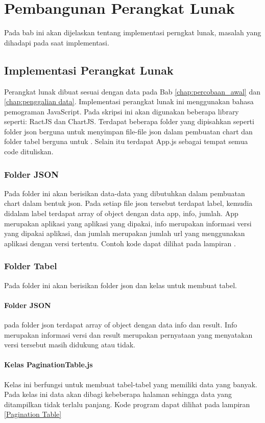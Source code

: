 \chapter{Pembangunan Perangkat Lunak}
\label{chap:pembangunan PL}
Pada bab ini akan dijelaskan tentang implementasi perngkat lunak, masalah yang dihadapi pada saat implementasi.
\section{Implementasi Perangkat Lunak}
Perangkat lunak dibuat sesuai dengan data pada Bab \ref{chap:percobaan_awal} dan \ref{chap:penggalian data}. Implementasi perangkat lunak ini menggunakan bahasa pemograman JavaScript. Pada skripsi ini akan digunakan beberapa library seperti: RactJS dan ChartJS. Terdapat beberapa folder yang dipisahkan seperti folder json berguna untuk menyimpan file-file json dalam pembuatan chart dan folder tabel berguna untuk . Selain itu terdapat App.js sebagai tempat semua code dituliskan.

\subsection{Folder JSON}
Pada folder ini akan berisikan data-data yang dibutuhkan dalam pembuatan chart dalam bentuk json. Pada setiap file json tersebut terdapat label, kemudia didalam label terdapat array of object dengan data app, info, jumlah. App merupakan aplikasi yang aplikasi yang dipakai, info merupakan informasi versi yang dipakai aplikasi, dan jumlah merupakan jumlah url yang menggunakan aplikasi dengan versi tertentu. Contoh kode dapat dilihat pada lampiran .

\subsection{Folder Tabel}
Pada folder ini akan berisikan folder json dan kelas untuk membuat tabel. 
\subsubsection{Folder JSON}
pada folder json terdapat array of object dengan data info dan result. Info merupakan informasi versi dan result merupakan pernyataan yang menyatakan versi tersebut masih didukung atau tidak. 
\subsubsection{Kelas PaginationTable.js}
Kelas ini berfungsi untuk membuat tabel-tabel yang memiliki data yang banyak. Pada kelas ini data akan dibagi kebeberapa halaman sehingga data yang ditampilkan tidak terlalu panjang. Kode program dapat dilihat pada lampiran \ref{Pagination Table}
